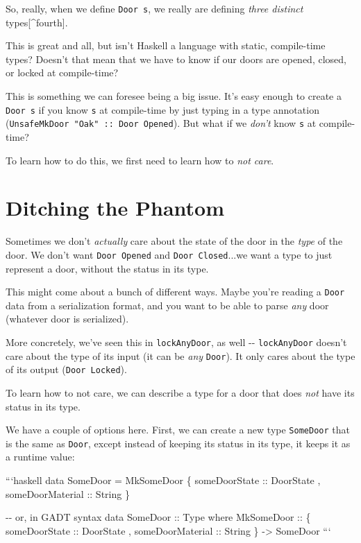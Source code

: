\documentclass[]{article}
\begin{document}
So, really, when we define \texttt{Door\ s}, we really are defining \emph{three
distinct} types{[}\^{}fourth{]}.

This is great and all, but isn't Haskell a language with static, compile-time
types? Doesn't that mean that we have to know if our doors are opened, closed,
or locked at compile-time?

This is something we can foresee being a big issue. It's easy enough to create a
\texttt{Door\ s} if you know \texttt{s} at compile-time by just typing in a type
annotation (\texttt{UnsafeMkDoor\ "Oak"\ ::\ Door\ \textquotesingle{}Opened}).
But what if we \emph{don't} know \texttt{s} at compile-time?

To learn how to do this, we first need to learn how to \emph{not care}.

\section{Ditching the Phantom}

Sometimes we don't \emph{actually} care about the state of the door in the
\emph{type} of the door. We don't want \texttt{Door\ \textquotesingle{}Opened}
and \texttt{Door\ \textquotesingle{}Closed}...we want a type to just represent a
door, without the status in its type.

This might come about a bunch of different ways. Maybe you're reading a
\texttt{Door} data from a serialization format, and you want to be able to parse
\emph{any} door (whatever door is serialized).

More concretely, we've seen this in \texttt{lockAnyDoor}, as well -\/-
\texttt{lockAnyDoor} doesn't care about the type of its input (it can be
\emph{any} \texttt{Door}). It only cares about the type of its output
(\texttt{Door\ \textquotesingle{}Locked}).

To learn how to not care, we can describe a type for a door that does \emph{not}
have its status in its type.

We have a couple of options here. First, we can create a new type
\texttt{SomeDoor} that is the same as \texttt{Door}, except instead of keeping
its status in its type, it keeps it as a runtime value:

```haskell data SomeDoor = MkSomeDoor \{ someDoorState :: DoorState ,
someDoorMaterial :: String \}

-\/- or, in GADT syntax data SomeDoor :: Type where MkSomeDoor :: \{
someDoorState :: DoorState , someDoorMaterial :: String \} -\textgreater{}
SomeDoor ```
\end{document}
